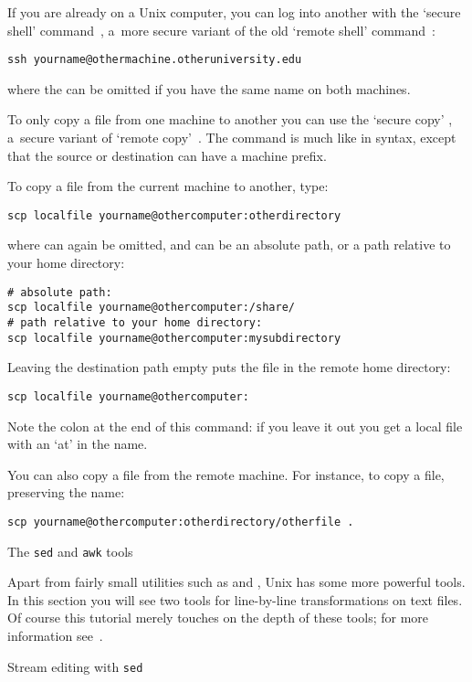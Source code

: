 If you are already on a Unix computer, you can log into another with
the `secure shell' command~, a~more secure variant
of the old `remote shell' command~:
\begin{lstlisting}
ssh yourname@othermachine.otheruniversity.edu
\end{lstlisting}
where the  can be omitted if you have the same name on
both machines.

To only copy a file from one machine to another you can use the
`secure copy' , a~secure variant of `remote
copy'~. The  command is much like  in syntax,
except that the source or destination can have a machine prefix.

To copy a file from the current machine to
another, type:
\begin{lstlisting}
scp localfile yourname@othercomputer:otherdirectory
\end{lstlisting}
where  can again be omitted, and  can be
an absolute path, or a path relative to your home directory:
\begin{lstlisting}
# absolute path:
scp localfile yourname@othercomputer:/share/
# path relative to your home directory:
scp localfile yourname@othercomputer:mysubdirectory
\end{lstlisting}
Leaving the destination path empty puts the file in the remote home directory:
\begin{lstlisting}
scp localfile yourname@othercomputer:
\end{lstlisting}
Note the colon at the end of this command: if you leave it out you get
a local file with an `at' in the name.

You can also copy a file from the remote machine. For instance, to
copy a file, preserving the name:
\begin{lstlisting}
scp yourname@othercomputer:otherdirectory/otherfile .
\end{lstlisting}

 {The {\tt sed} and {\tt awk} tools}

Apart from fairly small utilities such as  and , Unix
has some more powerful tools. In this section you will see two tools for
line-by-line transformations on text files. Of course this tutorial
merely touches on the depth of these tools; for more information
see~\cite{AWK:awk,OReilly:sedawk}.

 {Stream editing with \protect\texttt{sed}}

